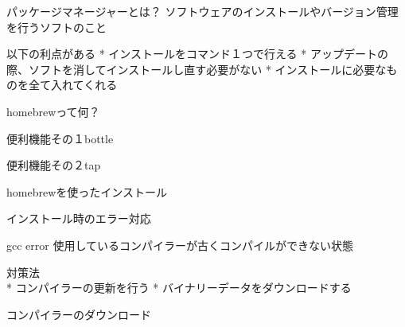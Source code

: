 \documentclass[
  ignorenonframetext,
]{beamer}
\begin{document}
\begin{frame}{パッケージマネージャーとは？}
\protect\hypertarget{ux30d1ux30c3ux30b1ux30fcux30b8ux30deux30cdux30fcux30b8ux30e3ux30fcux3068ux306f}{}
ソフトウェアのインストールやバージョン管理を行うソフトのこと

以下の利点がある * インストールをコマンド１つで行える *
アップデートの際、ソフトを消してインストールし直す必要がない *
インストールに必要なものを全て入れてくれる
\end{frame}

\begin{frame}{homebrewって何？}
\protect\hypertarget{homebrewux3063ux3066ux4f55}{}
\end{frame}

\begin{frame}{便利機能その１bottle}
\protect\hypertarget{ux4fbfux5229ux6a5fux80fdux305dux306euxff11bottle}{}
\end{frame}

\begin{frame}{便利機能その２tap}
\protect\hypertarget{ux4fbfux5229ux6a5fux80fdux305dux306euxff12tap}{}
\end{frame}

\begin{frame}{homebrewを使ったインストール}
\protect\hypertarget{homebrewux3092ux4f7fux3063ux305fux30a4ux30f3ux30b9ux30c8ux30fcux30eb}{}
\end{frame}

\begin{frame}{インストール時のエラー対応}
\protect\hypertarget{ux30a4ux30f3ux30b9ux30c8ux30fcux30ebux6642ux306eux30a8ux30e9ux30fcux5bfeux5fdc}{}
\begin{block}{gcc error}
\protect\hypertarget{gcc-error}{}
使用しているコンパイラーが古くコンパイルができない状態

対策法\\
* コンパイラーの更新を行う * バイナリーデータをダウンロードする
\end{block}
\end{frame}

\begin{frame}{コンパイラーのダウンロード}
\protect\hypertarget{ux30b3ux30f3ux30d1ux30a4ux30e9ux30fcux306eux30c0ux30a6ux30f3ux30edux30fcux30c9}{}
\end{frame}
\end{document}
